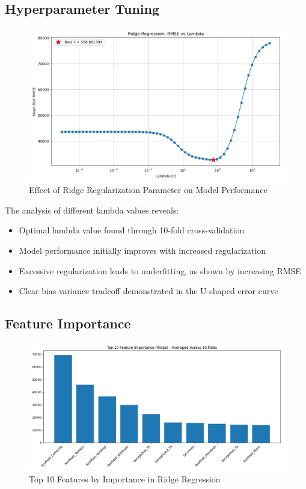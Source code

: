 \documentclass[12pt]{report}
\begin{document}
\subsection{Hyperparameter Tuning}

\begin{figure}[H]
    \centering
    \includegraphics[width=1.0\textwidth]{figures/ridge_lambda_vs_rmse.png}
    \caption{Effect of Ridge Regularization Parameter on Model Performance}
    \label{fig:ridge_lambda}
\end{figure}

The analysis of different lambda values reveals:
\begin{itemize}
    \item Optimal lambda value found through 10-fold cross-validation
    \item Model performance initially improves with increased regularization
    \item Excessive regularization leads to underfitting, as shown by increasing RMSE
    \item Clear bias-variance tradeoff demonstrated in the U-shaped error curve
\end{itemize}

\subsection{Feature Importance}
\begin{figure}[H]
    \centering
    \includegraphics[width=1.0\textwidth]{figures/ridge_feature_importance.png}
    \caption{Top 10 Features by Importance in Ridge Regression}
    \label{fig:ridge_importance}
\end{figure}
\end{document}
